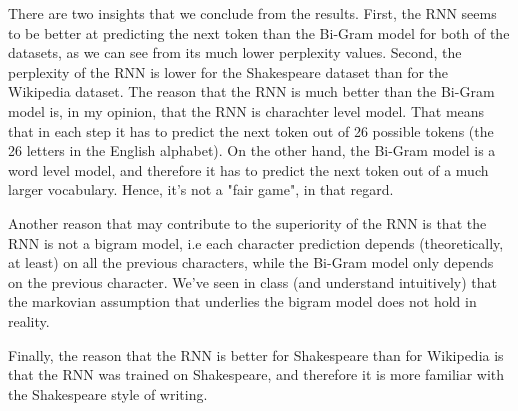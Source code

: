 There are two insights that we conclude from the results. First, the RNN seems to be better at predicting the next token than the Bi-Gram model for both of the datasets, as we can see from its much lower perplexity values.
Second, the perplexity of the RNN is lower for the Shakespeare dataset than for the Wikipedia dataset.
The reason that the RNN is much better than the Bi-Gram model is, in my opinion, that the RNN is charachter level model. 
That means that in each step it has to predict the next token out of 26 possible tokens (the 26 letters in the English alphabet). 
On the other hand, the Bi-Gram model is a word level model, and therefore it has to predict the next token out of a much larger vocabulary. Hence, it's not a "fair game", in that regard.

Another reason that may contribute to the superiority of the RNN is that the RNN is not a bigram model, i.e each character prediction depends (theoretically, at least) on all the previous characters, while the Bi-Gram model only depends on the previous character. 
We've seen in class (and understand intuitively) that the markovian assumption that underlies the bigram model does not hold in reality.

Finally, the reason that the RNN is better for Shakespeare than for Wikipedia is that the RNN was trained on Shakespeare, and therefore it is more familiar with the Shakespeare style of writing.